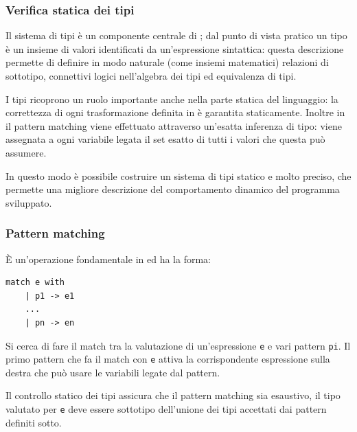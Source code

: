 \subsubsection{Verifica statica dei tipi}
Il sistema di tipi è un componente centrale di \cduce; dal punto di vista pratico un tipo è un insieme di valori identificati da un'espressione sintattica: questa descrizione permette di definire in modo naturale (come insiemi matematici) relazioni di sottotipo, connettivi logici nell'algebra dei tipi ed equivalenza di tipi.

I tipi ricoprono un ruolo importante anche nella parte statica del linguaggio: la correttezza di ogni trasformazione definita in \cduce è garantita staticamente. Inoltre in \cduce il pattern matching viene effettuato attraverso un'esatta inferenza di tipo: viene assegnata a ogni variabile legata il set esatto di tutti i valori che questa può assumere.

In questo modo è possibile costruire un sistema di tipi statico e molto preciso, che permette una migliore descrizione del comportamento dinamico del programma sviluppato.
\subsubsection{Pattern matching}
\label{CDucePattern}
È un'operazione fondamentale in \cduce ed ha la forma:
\begin{verbatim}
match e with
	| p1 -> e1
	...
	| pn -> en
\end{verbatim}
Si cerca di fare il match tra la valutazione di un'espressione \verb|e| e vari pattern \verb|pi|. Il primo pattern che fa il match con \verb|e| attiva la corrispondente espressione sulla destra che può usare le variabili legate dal pattern.

Il controllo statico dei tipi assicura che il pattern matching sia esaustivo, il tipo valutato per \verb|e| deve essere sottotipo dell'unione dei tipi accettati dai pattern definiti sotto.
